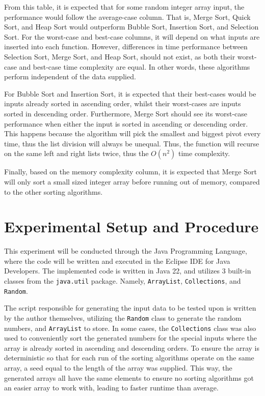 \documentclass{report}
\begin{document}
From this table, it is expected that for some random integer array input, the performance would follow the average-case column. That is, Merge Sort, Quick Sort, and Heap Sort would outperform Bubble Sort, Insertion Sort, and Selection Sort. For the worst-case and best-case columns, it will depend on what inputs are inserted into each function. However, differences in time performance between Selection Sort, Merge Sort, and Heap Sort, should not exist, as both their worst-case and best-case time complexity are equal. In other words, these algorithms perform independent of the data supplied.

For Bubble Sort and Insertion Sort, it is expected that their best-cases would be inputs already sorted in ascending order, whilst their worst-cases are inputs sorted in descending order. Furthermore, Merge Sort should see its worst-case performance when either the input is sorted in ascending or descending order. This happens because the algorithm will pick the smallest and biggest pivot every time, thus the list division will always be unequal. Thus, the function will recurse on the same left and right lists twice, thus the $O(n^2)$ time complexity.

Finally, based on the memory complexity column, it is expected that Merge Sort will only sort a small sized integer array before running out of memory, compared to the other sorting algorithms.

\section{Experimental Setup and Procedure}
This experiment will be conducted through the Java Programming Language, where the code will be written and executed in the Eclipse IDE for Java Developers.
The implemented code is written in Java 22, and utilizes 3 built-in classes from the \lstinline|java.util| package. Namely, \lstinline|ArrayList|, \lstinline|Collections|, and \lstinline|Random|.

The script responsible for generating the input data to be tested upon is written by the author themselves, utilizing the \lstinline|Random| class to generate the random numbers, and \lstinline|ArrayList| to store. In some cases, the \lstinline|Collections| class was also used to conveniently sort the generated numbers for the special inputs where the array is already sorted in ascending and descending orders. To ensure the array is deterministic so that for each run of the sorting algorithms operate on the same array, a seed equal to the length of the array was supplied. This way, the generated arrays all have the same elements to ensure no sorting algorithms got an easier array to work with, leading to faster runtime than average. 
\end{document}
